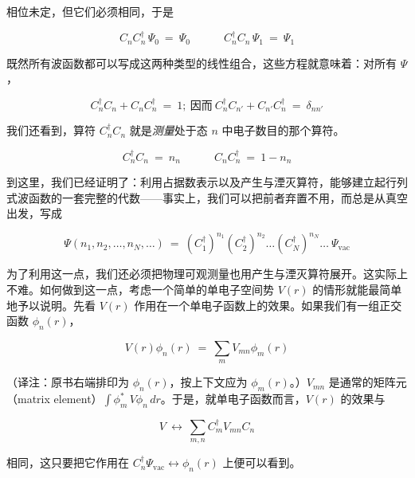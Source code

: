 相位未定，但它们必须相同，于是

\begin{equation*}
C_n C_n^{\dagger}\,\Psi_0\ =\ \Psi_0\qquad\quad C_n^{\dagger} C_n\,\Psi_1\ =\ \Psi_1
\end{equation*}

既然所有波函数都可以写成这两种类型的线性组合，这些方程就意味着：对所有 $\Psi$，

\begin{equation*}
C_n^{\dagger} C_n+C_n C_n^{\dagger}\ =\ 1;\ \text{因而}\ C_n^{\dagger} C_{n'}+C_{n'}C_n^{\dagger}\ =\ \delta_{nn'}
\end{equation*}

我们还看到，算符 $C_n^{\dagger}C_n$ 就是\emph{测量}处于态 $n$ 中电子数目的那个算符。

\begin{equation*}
C_n^{\dagger} C_n\ =\ n_n\qquad\quad C_n C_n^{\dagger}\ =\ 1-n_n
\end{equation*}

到这里，我们已经证明了：利用占据数表示以及产生与湮灭算符，能够建立起行列式波函数的一套完整的代数——事实上，我们可以把前者弃置不用，而总是从真空出发，写成

\begin{equation*}
\Psi(n_1,n_2,\ldots,n_N,\ldots)\ =\ (C_1^{\dagger})^{n_1}(C_2^{\dagger})^{n_2}\ldots(C_N^{\dagger})^{n_N}\ldots\ \Psi_{\mathrm{vac}}
\end{equation*}

为了利用这一点，我们还必须把物理可观测量也用产生与湮灭算符展开。这实际上不难。如何做到这一点，考虑一个简单的单电子空间势 $V(r)$ 的情形就能最简单地予以说明。先看 $V(r)$ 作用在一个单电子函数上的效果。如果我们有一组正交函数 $\phi_n(r)$，

\begin{equation*}
V(r)\phi_n(r)\ =\ \sum_m V_{mn}\phi_m(r)
\end{equation*}

（译注：原书右端排印为 $\phi_n(r)$，按上下文应为 $\phi_m(r)$。）$V_{mn}$ 是通常的矩阵元（matrix element）$\int\phi_m^*\,V\phi_n\,dr$。于是，就单电子函数而言，$V(r)$ 的效果与

\begin{equation*}
V\ \longleftrightarrow\ \sum_{m,n} C_m^{\dagger} V_{mn} C_n
\tag{1}
\end{equation*}

相同，这只要把它作用在 $C_n^{\dagger}\Psi_{\mathrm{vac}}\leftrightarrow\phi_n(r)$ 上便可以看到。

